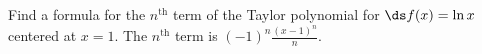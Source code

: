 {Find a formula for the $n^\text{th}$ term of the Taylor polynomial for $\ds f(x)=\ln x$ centered at $x=1$.
}
{The $n^\text{th}$ term is $(-1)^n\frac{(x-1)^n}{n}$.
}